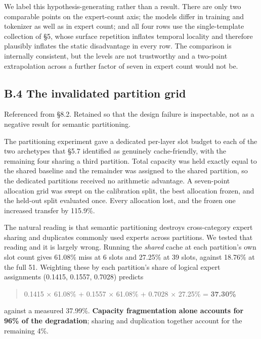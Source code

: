 \documentclass[
  10pt,
  letterpaper,
  10pt]{article}
\begin{document}
We label this hypothesis-generating rather than a result. There are only
two comparable points on the expert-count axis; the models differ in
training and tokenizer as well as in expert count; and all four rows use
the single-template collection of §5, whose surface repetition inflates
temporal locality and therefore plausibly inflates the static
disadvantage in every row. The comparison is internally consistent, but
the levels are not trustworthy and a two-point extrapolation across a
further factor of seven in expert count would not be.

\subsection{B.4 The invalidated partition
grid}\label{b.4-the-invalidated-partition-grid}

Referenced from §8.2. Retained so that the design failure is
inspectable, not as a negative result for semantic partitioning.

The partitioning experiment gave a dedicated per-layer slot budget to
each of the two archetypes that §5.7 identified as genuinely
cache-friendly, with the remaining four sharing a third partition. Total
capacity was held exactly equal to the shared baseline and the remainder
was assigned to the shared partition, so the dedicated partitions
received no arithmetic advantage. A seven-point allocation grid was
swept on the calibration split, the best allocation frozen, and the
held-out split evaluated once. Every allocation lost, and the frozen one
increased transfer by 115.9\%.

The natural reading is that semantic partitioning destroys
cross-category expert sharing and duplicates commonly used experts
across partitions. We tested that reading and it is largely wrong.
Running the \emph{shared} cache at each partition's own slot count gives
61.08\% miss at 6 slots and 27.25\% at 39 slots, against 18.76\% at the
full 51. Weighting these by each partition's share of logical expert
assignments (0.1415, 0.1557, 0.7028) predicts

\begin{quote}
0.1415 \(\times\) 61.08\% + 0.1557 \(\times\) 61.08\% + 0.7028
\(\times\) 27.25\% = \textbf{37.30\%}
\end{quote}

against a measured 37.99\%. \textbf{Capacity fragmentation alone
accounts for 96\% of the degradation}; sharing and duplication together
account for the remaining 4\%.
\end{document}
